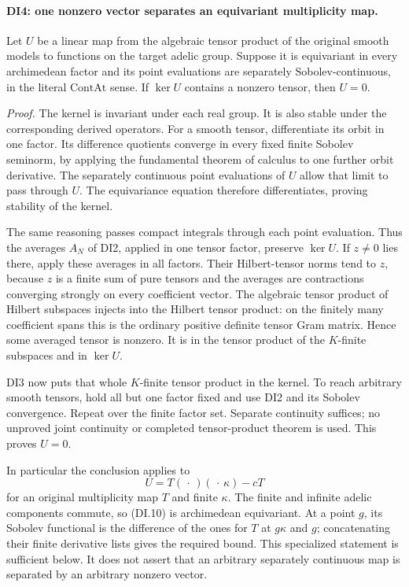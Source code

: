 \paragraph{DI4: one nonzero vector separates an equivariant multiplicity map.}
\label{claim:DI4}
Let \(U\) be a linear map from the algebraic tensor product of the
original smooth models to functions on the target adelic group.
Suppose it is equivariant in every archimedean factor and its point
evaluations are separately Sobolev-continuous, in the literal
\(\mathrm{ContAt}\) sense. If \(\ker U\) contains a nonzero tensor,
then \(U=0\).

\emph{Proof.}
The kernel is invariant under each real group. It is also stable under
the corresponding derived operators. For a smooth tensor, differentiate
its orbit in one factor. Its difference quotients converge in every
fixed finite Sobolev seminorm, by applying the fundamental theorem of
calculus to one further orbit derivative. The separately continuous
point evaluations of \(U\) allow that limit to pass through \(U\).
The equivariance equation therefore differentiates, proving stability
of the kernel.

The same reasoning passes compact integrals through each point
evaluation. Thus the averages \(A_N\) of DI2, applied in one tensor
factor, preserve \(\ker U\). If \(z\ne0\) lies there, apply these
averages in all factors. Their Hilbert-tensor norms tend to \(z\),
because \(z\) is a finite sum of pure tensors and the averages are
contractions converging strongly on every coefficient vector. The
algebraic tensor product of Hilbert subspaces injects into the Hilbert
tensor product: on the finitely many coefficient spans this is the
ordinary positive definite tensor Gram matrix. Hence some averaged
tensor is nonzero. It is in the tensor product of the \(K\)-finite
subspaces and in \(\ker U\).

DI3 now puts that whole \(K\)-finite tensor product in the kernel.
To reach arbitrary smooth tensors, hold all but one factor fixed and
use DI2 and its Sobolev convergence. Repeat over the finite factor
set. Separate continuity suffices; no unproved joint continuity or
completed tensor-product theorem is used. This proves \(U=0\).

In particular the conclusion applies to
\[
             U=T(\,\cdot\,)(\,\cdot\,\kappa)-cT
 \tag{DI.10}
\]
for an original multiplicity map \(T\) and finite \(\kappa\).
The finite and infinite adelic components commute, so (DI.10) is
archimedean equivariant. At a point \(g\), its Sobolev functional
is the difference of the ones for \(T\) at \(g\kappa\) and \(g\);
concatenating their finite derivative lists gives the required bound.
This specialized statement is sufficient below. It does not assert
that an arbitrary separately continuous map is separated by an
arbitrary nonzero vector.


